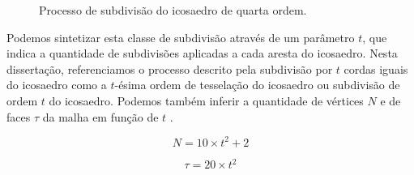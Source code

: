 \documentclass[
    12pt,                %
    oneside,            %
    a4paper,            %
    english,            %
    french,                %
    spanish,            %
    brazil                %
    ]{abntex2}
\begin{document}
\begin{figure}[ht]
\centering
\captionsetup[subfloat]{farskip=0pt,nearskip=0pt}
\centering
    \hspace{1em}
     \caption{Processo de subdivisão do icosaedro de quarta ordem.}
    \label{fig::icosaedro_subdivisao_4}
\end{figure}

Podemos sintetizar esta classe de subdivisão através de um parâmetro $t$, que indica a quantidade de subdivisões aplicadas a cada aresta do icosaedro. Nesta dissertação, referenciamos o processo descrito pela subdivisão por $t$ cordas iguais do icosaedro como a \textsf{$t$-ésima ordem de tesselação do icosaedro} ou \textsf{subdivisão de ordem $t$ do icosaedro}. Podemos também inferir a quantidade de vértices $N$ e de faces $\tau$ da malha em função de $t$ \cite{popko2012}.

\begin{equation}
\label{eq::icosa_samples}
    N = 10\times t^2 + 2
\end{equation}

\begin{equation}
\label{eq::icosphere_triangulos}
\tau = 20\times t^2
\end{equation}
\end{document}
